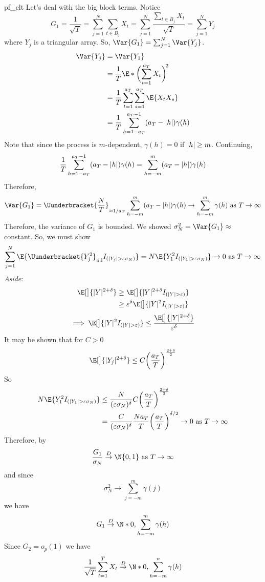 \begin{Proof}{}{pf_clt}
    Let's deal with the big block terms. Notice
    \[ G_1=\frac{1}{\sqrt{T}}=\sum_{j=1}^{N} \sum_{t\in B_j}X_t=
        \sum_{j=1}^{N}\frac{\sum_{t\in B_j} X_t}{\sqrt{T}}=\sum_{j=1}^{N}Y_j  \]
    where $ Y_{j} $ is a triangular array. So,
    $ \Var{G_1}=\sum_{j=1}^{N} \Var{Y_j} $.
    \begin{align*}
        \Var{Y_j}
         & =\Var{Y_1}                                                 \\
         & =\frac{1}{T} \E*{\biggl(\sum_{t=1}^{a_T}X_t\biggr)^{\!2}}  \\
         & =\frac{1}{T}\sum_{t=1}^{a_T} \sum_{s=1}^{a_T} \E{X_t X_s}  \\
         & =\frac{1}{T} \sum_{h=1-a_T}^{a_T-1} (a_T-\abs{h})\gamma(h)
    \end{align*}
    Note that since the process is $ m $-dependent, $ \gamma(h)=0 $ if $ \lvert h\rvert\ge m $.
    Continuing,
    \[ \frac{1}{T} \sum_{h=1-a_T}^{a_T-1} (a_T-\lvert h\rvert)\gamma(h)=
        \sum_{h=-m}^{m} (a_T-\lvert h\rvert)\gamma(h) \]
    Therefore,
    \[ \Var{G_1}=\Uunderbracket{\frac{N}{T}}_{\approx 1/a_T}
        \sum_{h=-m}^{m}(a_T-\abs{h})\gamma(h) \to \sum_{h=-m}^{m} \gamma(h)\text{ as }T\to\infty \]
    Therefore, the variance of $ G_1 $ is bounded.
    We showed $ \sigma_N^2=\Var{G_1}\approx $ constant. So, we must show
    \[
        \sum_{j=1}^{N} \E{\Uunderbracket{Y_{j}^2}_{\text{iid}} I_{(\abs{Y_{j}}>\varepsilon\sigma_N)}}=
        N\E{Y_{1}^2 I_{(\abs{Y_{1}}>\varepsilon\sigma_N)}} \to 0\text{ as } T\to\infty
    \]
    \emph{Aside}:
    \begin{align*}
        \E[\big]{\abs{Y}^{2+\delta}}
         & \ge \E[\big]{\abs{Y}^{2+\delta}I_{(\abs{Y}>\varepsilon)}}           \\
         & \ge \varepsilon^\delta\E[\big]{\abs{Y}^2 I_{(\abs{Y}>\varepsilon)}} \\
    \end{align*}
    \[ \implies \E[\big]{\abs{Y}^2 I_{(\abs{Y}>\varepsilon)}}\le \frac{\E[\big]{\abs{Y}^{2+\delta}}}{\varepsilon^\delta} \]
    It may be shown that for $ C>0 $
    \[ \E[\big]{\abs{Y_j}^{2+\delta}}\le C\biggl(\frac{a_T}{T} \biggr)^{\frac{2+\delta}{2}} \]
    So
    \begin{align*}
        N\E{Y_{1}^2 I_{(\abs{Y_{1}}>\varepsilon\sigma_N)}}
         & \le \frac{N}{(\varepsilon\sigma_N)^\delta}C\biggl(\frac{a_T}{T} \biggr)^{\frac{2+\delta}{2}} \\
         & =\frac{C}{(\varepsilon\sigma_N)^\delta}
        \frac{N a_T}{T}\biggl(\frac{a_T}{T} \biggr)^{\delta/2}\to 0\text{ as }T\to\infty
    \end{align*}
    Therefore, by~
    \[ \frac{G_1}{\sigma_N}\stackrel{D}{\to}\N{0,1}\text{ as }T\to\infty  \]
    and since
    \[ \sigma_N^2\to \sum_{j=-m}^{m} \gamma(j) \]
    we have
    \[ G_1\stackrel{D}{\to}\N*{0,\sum_{h=-m}^{m} \gamma(h)} \]
    Since $ G_2=o_p(1) $ we have
    \[ \frac{1}{\sqrt{T}}\sum_{t=1}^{T} X_t\stackrel{D}{\to}\N*{0,\sum_{h=-m}^{n} \gamma(h)}  \]
\end{Proof}
